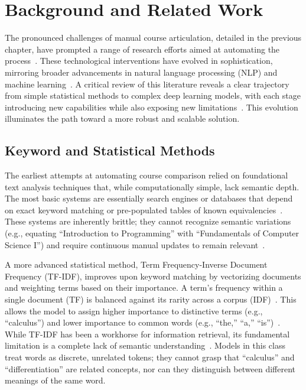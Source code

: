 \chapter{Background and Related Work}\label{ch:2}

The pronounced challenges of manual course articulation, detailed in the previous chapter, have prompted a range of research efforts aimed at automating the process~\cite{ma_course_recommendation_2017, PardosCourse2Vec2019, pardos10.1145/3330430.3333622, JiangPardosMulti2VecEDM2020,XuPardosSubwordEmbeddings2024}.  These technological interventions have evolved in sophistication, mirroring broader advancements in natural language processing (NLP) and machine learning~\cite{shiferaw2024}.  A critical review of this literature reveals a clear trajectory from simple statistical methods to complex deep learning models, with each stage introducing new capabilities while also exposing new limitations~\cite{pardos10.1145/3330430.3333622}.  This evolution illuminates the path toward a more robust and scalable solution.

\section{Keyword and Statistical Methods}\label{ch:2.1}
The earliest attempts at automating course comparison relied on foundational text analysis techniques that, while computationally simple, lack semantic depth.  The most basic systems are essentially search engines or databases that depend on exact keyword matching or pre-populated tables of known equivalencies~\cite{shamrock}.  These systems are inherently brittle; they cannot recognize semantic variations (e.g., equating ``Introduction to Programming'' with ``Fundamentals of Computer Science I'') and require continuous manual updates to remain relevant~\cite{shiferaw2024}.

A more advanced statistical method, Term Frequency-Inverse Document Frequency (TF-IDF), improves upon keyword matching by vectorizing documents and weighting terms based on their importance.  A term's frequency within a single document (TF) is balanced against its rarity across a corpus (IDF)~\cite{AIZAWA200345}.  This allows the model to assign higher importance to distinctive terms (e.g., ``calculus'') and lower importance to common words (e.g., ``the,'' ``a,'' ``is'')~\cite{AIZAWA200345}.  While TF-IDF has been a workhorse for information retrieval, its fundamental limitation is a complete lack of semantic understanding~\cite{AIZAWA200345}.  Models in this class treat words as discrete, unrelated tokens;  they cannot grasp that ``calculus'' and ``differentiation'' are related concepts, nor can they distinguish between different meanings of the same word.

